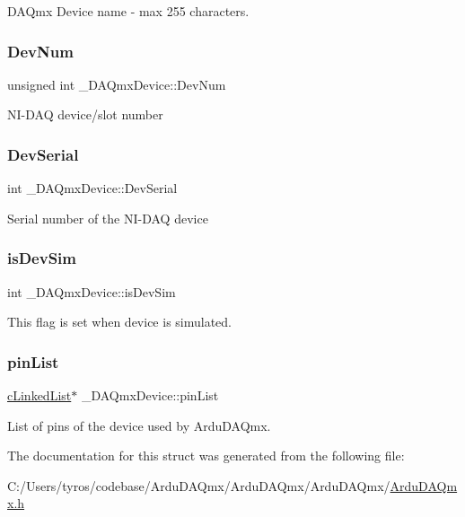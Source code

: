 D\+A\+Qmx Device name -\/ max 255 characters. \mbox{\label{struct___d_a_qmx_device_a6daae65b3caf69476dcdd3d9a790d29d}} 
\subsubsection{\texorpdfstring{Dev\+Num}{DevNum}}
{\footnotesize\ttfamily unsigned int \+\_\+\+D\+A\+Qmx\+Device\+::\+Dev\+Num}

N\+I-\/\+D\+AQ device/slot number \mbox{\label{struct___d_a_qmx_device_aa08a5a76d6516ab92a7c608a4e98a9f3}} 
\subsubsection{\texorpdfstring{Dev\+Serial}{DevSerial}}
{\footnotesize\ttfamily int \+\_\+\+D\+A\+Qmx\+Device\+::\+Dev\+Serial}

Serial number of the N\+I-\/\+D\+AQ device \mbox{\label{struct___d_a_qmx_device_a02d188ae3809b065b00d6e02d9ed93fc}} 
\subsubsection{\texorpdfstring{is\+Dev\+Sim}{isDevSim}}
{\footnotesize\ttfamily int \+\_\+\+D\+A\+Qmx\+Device\+::is\+Dev\+Sim}

This flag is set when device is simulated. \mbox{\label{struct___d_a_qmx_device_afa73f79090ac9fd75a0e23e6d6d94f6a}} 
\subsubsection{\texorpdfstring{pin\+List}{pinList}}
{\footnotesize\ttfamily \mbox{\hyperlink{c_linked_list_8h_aac1ab3387f7254e06b22dc5a54f2e5f6}{c\+Linked\+List}}$\ast$ \+\_\+\+D\+A\+Qmx\+Device\+::pin\+List}

List of pins of the device used by Ardu\+D\+A\+Qmx. 

The documentation for this struct was generated from the following file\+:\begin{DoxyCompactItemize}
\item 
C\+:/\+Users/tyros/codebase/\+Ardu\+D\+A\+Qmx/\+Ardu\+D\+A\+Qmx/\+Ardu\+D\+A\+Qmx/\mbox{\hyperlink{_ardu_d_a_qmx_8h}{Ardu\+D\+A\+Qmx.\+h}}\end{DoxyCompactItemize}

